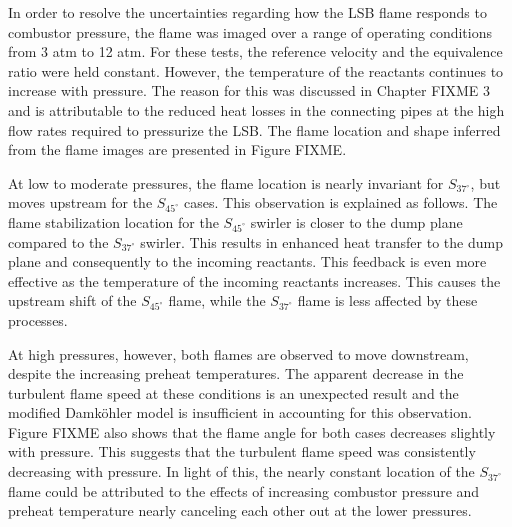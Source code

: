 In order to resolve the uncertainties regarding how the LSB flame responds to combustor pressure, the flame was imaged over a range of operating conditions from 3 atm to 12 atm.
For these tests, the reference velocity and the equivalence ratio were held constant.
However, the temperature of the reactants continues to increase with pressure.
The reason for this was discussed in Chapter FIXME 3 and is attributable to the reduced heat losses in the connecting pipes at the high flow rates required to pressurize the LSB.
The flame location and shape inferred from the flame images are presented in Figure FIXME.

At low to moderate pressures, the flame location is nearly invariant for \(S_{37^\circ}\), but moves upstream for the \(S_{45^\circ}\) cases.
This observation is explained as follows.
The flame stabilization location for the \(S_{45^\circ}\) swirler is closer to the dump plane compared to the \(S_{37^\circ}\) swirler.
This results in enhanced heat transfer to the dump plane and consequently to the incoming reactants.
This feedback is even more effective as the temperature of the incoming reactants increases.
This causes the upstream shift of the \(S_{45^\circ}\) flame, while the \(S_{37^\circ}\) flame is less affected by these processes.

At high pressures, however, both flames are observed to move downstream, despite the increasing preheat temperatures.
The apparent decrease in the turbulent flame speed at these conditions is an unexpected result and the modified Damk\"ohler model is insufficient in accounting for this observation.
Figure FIXME also shows that the flame angle for both cases decreases slightly with pressure.
This suggests that the turbulent flame speed was consistently decreasing with pressure.
In light of this, the nearly constant location of the \(S_{37^\circ}\) flame could be attributed to the effects of increasing combustor pressure and preheat temperature nearly canceling each other out at the lower pressures.


